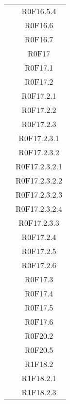 \documentclass[../DefinizioneDiProdotto.tex]{subfiles}
\begin{document}
\begin{longtable}{|c|c|}
				& R0F16.5.4\\
				& R0F16.6\\
				& R0F16.7\\
				& R0F17\\
				& R0F17.1\\
				& R0F17.2\\
				& R0F17.2.1\\
				& R0F17.2.2\\
				& R0F17.2.3\\
				& R0F17.2.3.1\\
				& R0F17.2.3.2\\
				& R0F17.2.3.2.1\\
				& R0F17.2.3.2.2\\
				& R0F17.2.3.2.3\\
				& R0F17.2.3.2.4\\
				& R0F17.2.3.3\\
				& R0F17.2.4\\
				& R0F17.2.5\\
				& R0F17.2.6\\
				& R0F17.3\\
				& R0F17.4\\
				& R0F17.5\\
				& R0F17.6\\
				& R0F20.2\\
				& R0F20.5\\
				& R1F18.2\\
				& R1F18.2.1\\
				& R1F18.2.3\\
				\hline


\end{longtable}
\end{document}
